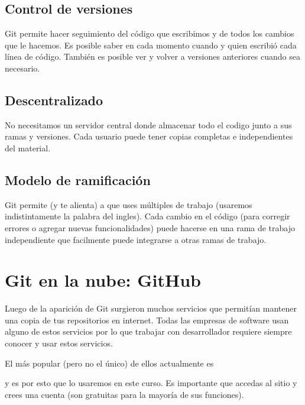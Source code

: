 \documentclass[a5paper,9pt,spanish]{sphinxmanual}
\begin{document}
\section{Control de versiones}
\label{\detokenize{git:control-de-versiones}}
\sphinxAtStartPar
Git permite hacer seguimiento del código que
escribimos y de todos los cambios que le hacemos. Es posible saber
en cada momento cuando y quien escribió cada línea de código.
También es posible ver y volver a versiones anteriores cuando sea
necesario.


\section{Descentralizado}
\label{\detokenize{git:descentralizado}}
\sphinxAtStartPar
No necesitamos un servidor central donde almacenar todo el codigo
junto a sus ramas y versiones.
Cada usuario puede tener copias completas e independientes del material.


\section{Modelo de ramificación}
\label{\detokenize{git:modelo-de-ramificacion}}
\sphinxAtStartPar
Git permite (y te alienta) a que uses múltiples  de trabajo
(usaremos indistintamente la palabra  del ingles).
Cada cambio en el código (para corregir errores o agregar nuevas
funcionalidades) puede hacerse en una rama de trabajo independiente
que facilmente puede integrarse a otras ramas de trabajo.

\sphinxstepscope


\chapter{Git en la nube: GitHub}
\label{\detokenize{github:git-en-la-nube-github}}\label{\detokenize{github::doc}}
\sphinxAtStartPar
Luego de la aparición de Git surgieron muchos servicios que
permitían mantener una copia de tus repositorios en internet.
Todas las empresas de software usan alguno de estos servicios
por lo que trabajar con desarrollador requiere siempre conocer
y usar estos servicios.

\sphinxAtStartPar
El más popular (pero no el único) de ellos actualmente es
%
\begin{footnote}[6]\sphinxAtStartFootnote
{}
%
\end{footnote} y es por esto que lo usaremos
en este curso.
Es importante que accedas al sitio y crees una cuenta (son gratuitas
para la mayoría de sus funciones).
\end{document}
